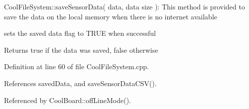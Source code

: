Cool\+File\+System\+::save\+Sensor\+Data( data, data size )\+: This method is provided to save the data on the local memory when there is no internet available

sets the saved data flag to T\+R\+UE when successful

\begin{DoxyReturn}{Returns}
true if the data was saved, false otherwise 
\end{DoxyReturn}


Definition at line 60 of file Cool\+File\+System.\+cpp.



References saved\+Data, and save\+Sensor\+Data\+C\+S\+V().



Referenced by Cool\+Board\+::off\+Line\+Mode().


